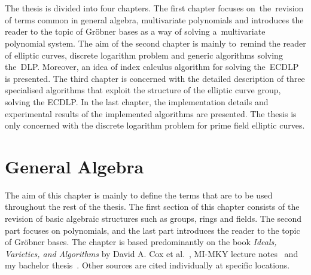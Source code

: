 \documentclass[thesis=M,english]{FITthesis}[2012/10/20]
\theoremstyle{remark}
\theoremstyle{definition}
\begin{document}
\\ \\
\noindent The thesis is divided into four chapters. The first chapter focuses on~the~revision of terms common in general algebra, multivariate polynomials and introduces the reader to the topic of Gröbner bases as a way of solving a~multivariate polynomial system. The aim of the second chapter is mainly to~remind the reader of elliptic curves, discrete logarithm problem and generic algorithms solving the~DLP. Moreover, an idea of index calculus algorithm for solving the~ECDLP is presented. The third chapter is concerned with the detailed description of three specialised algorithms that exploit the structure of the elliptic curve group, solving the ECDLP. In the last chapter, the implementation details and experimental results of the implemented algorithms are presented. The thesis is only concerned with the discrete logarithm problem for prime field elliptic curves.

\chapter{General Algebra}\label{mathBG}
%
The aim of this chapter is mainly to define the terms that are to be used throughout the rest of the thesis. The first section of this chapter consists of the revision of basic algebraic structures such as groups, rings and fields. The second part focuses on polynomials, and the last part introduces the reader to the topic of Gröbner bases. The chapter is based predominantly on the book \textit{Ideals, Varieties, and Algorithms} by David A. Cox et al.~\cite{algGeom}, MI-MKY lecture notes~\cite{mky} and my bachelor thesis~\cite{myBP}. Other sources are cited individually at specific locations.
\end{document}
